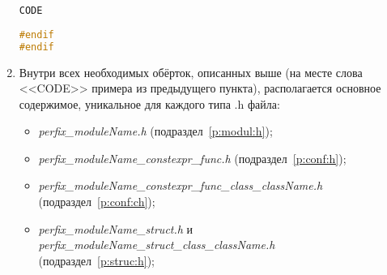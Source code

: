 \begin{enumerate}
\begin{lstlisting}[language=C++, frame=tlBR, basicstyle=\fontsize{10}{10}\ttfamily]
CODE
	
#endif
#endif\end{lstlisting}
	\item Внутри всех необходимых обёрток, описанных выше (на месте слова <<CODE>> примера из предыдущего пункта), располагается основное содержимое, уникальное для каждого типа .h файла:\begin{itemize}
		\item \textit{perfix\_moduleName.h} (подраздел~\ref{p:modul:h});
		\item \textit{perfix\_moduleName\_constexpr\_func.h} (подраздел~\ref{p:conf:h});
		\item \textit{perfix\-\_moduleName\-\_constexpr\-\_func\-\_class\-\_className.h} (подраздел~\ref{p:conf:ch});
		\item \textit{perfix\_moduleName\_struct.h} и \textit{perfix\-\_moduleName\-\_struct\-\_class\-\_class\-Name.h}\\(подраздел~\ref{p:struc:h});
	\end{itemize}
\end{enumerate}

